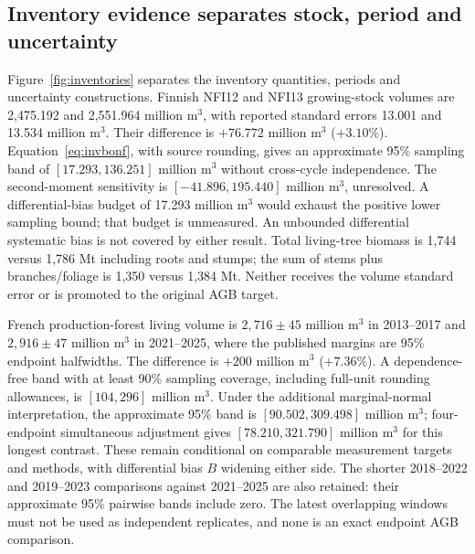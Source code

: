 \documentclass[11pt,a4paper]{article}
\begin{document}
\subsection{Inventory evidence separates stock, period and uncertainty}\label{sec:inventoryresults}
Figure~\ref{fig:inventories} separates the inventory quantities, periods and uncertainty constructions. Finnish NFI12 and NFI13 growing-stock volumes are 2,475.192 and 2,551.964 million m$^3$, with reported standard errors 13.001 and 13.534 million m$^3$. Their difference is $+76.772$ million m$^3$ ($+3.10\%$). Equation~\ref{eq:invbonf}, with source rounding, gives an approximate 95\% sampling band of $[17.293,136.251]$ million m$^3$ without cross-cycle independence. The second-moment sensitivity is $[-41.896,195.440]$ million m$^3$, unresolved. A differential-bias budget of 17.293 million m$^3$ would exhaust the positive lower sampling bound; that budget is unmeasured. An unbounded differential systematic bias is not covered by either result. Total living-tree biomass is 1,744 versus 1,786 Mt including roots and stumps; the sum of stems plus branches/foliage is 1,350 versus 1,384 Mt. Neither receives the volume standard error or is promoted to the original AGB target.

French production-forest living volume is $2,716\pm45$ million m$^3$ in 2013--2017 and $2,916\pm47$ million m$^3$ in 2021--2025, where the published margins are 95\% endpoint halfwidths. The difference is $+200$ million m$^3$ ($+7.36\%$). A dependence-free band with at least 90\% sampling coverage, including full-unit rounding allowances, is $[104,296]$ million m$^3$. Under the additional marginal-normal interpretation, the approximate 95\% band is $[90.502,309.498]$ million m$^3$; four-endpoint simultaneous adjustment gives $[78.210,321.790]$ million m$^3$ for this longest contrast. These remain conditional on comparable measurement targets and methods, with differential bias $B$ widening either side. The shorter 2018--2022 and 2019--2023 comparisons against 2021--2025 are also retained: their approximate 95\% pairwise bands include zero. The latest overlapping windows must not be used as independent replicates, and none is an exact endpoint AGB comparison.
\end{document}
